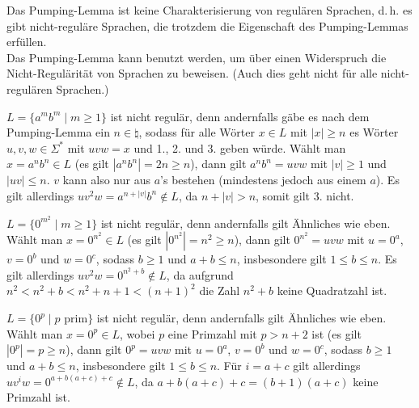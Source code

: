 \begin{Bem}
    Das Pumping-Lemma ist keine Charakterisierung von regulären Sprachen,
    d.\,h. es gibt nicht-reguläre Sprachen, die trotzdem die Eigenschaft des
    Pumping-Lemmas erfüllen.\\
    Das Pumping-Lemma kann benutzt werden, um über einen Widerspruch die
    Nicht-Regulärität von Sprachen zu beweisen.
    (Auch dies geht nicht für alle nicht-regulären Sprachen.)
\end{Bem}

\linie

\begin{Bsp}
    $L = \{a^m b^m \;|\; m \ge 1\}$ ist nicht regulär, denn andernfalls
    gäbe es nach dem Pumping-Lemma ein $n \in \natural$, sodass für alle
    Wörter $x \in L$ mit $|x| \ge n$ es Wörter $u, v, w \in \Sigma^\ast$
    mit $uvw = x$ und 1., 2. und 3. geben würde.
    Wählt man $x = a^n b^n \in L$ (es gilt $|a^n b^n| = 2n \ge n$),
    dann gilt $a^n b^n = uvw$ mit $|v| \ge 1$ und $|uv| \le n$.
    $v$ kann also nur aus $a$'s bestehen (mindestens jedoch aus einem $a$).
    Es gilt allerdings $uv^2 w = a^{n + |v|} b^n \notin L$, da
    $n + |v| > n$, somit gilt 3. nicht.
\end{Bsp}

\begin{Bsp}
    $L = \{0^{m^2} \;|\; m \ge 1\}$ ist nicht regulär, denn andernfalls
    gilt Ähnliches wie eben.
    Wählt man $x = 0^{n^2} \in L$ (es gilt $|0^{n^2}| = n^2 \ge n$),
    dann gilt $0^{n^2} = uvw$ mit $u = 0^a$, $v = 0^b$ und $w = 0^c$,
    sodass $b \ge 1$ und $a + b \le n$,
    insbesondere gilt $1 \le b \le n$.
    Es gilt allerdings $uv^2 w = 0^{n^2 + b} \notin L$, da aufgrund
    $n^2 < n^2 + b < n^2 + n + 1 < (n + 1)^2$ die Zahl $n^2 + b$ keine
    Quadratzahl ist.
\end{Bsp}

\begin{Bsp}
    $L = \{0^p \;|\; p \text{ prim}\}$ ist nicht regulär, denn andernfalls
    gilt Ähnliches wie eben.
    Wählt man $x = 0^p \in L$, wobei $p$ eine Primzahl mit $p > n + 2$ ist
    (es gilt $|0^p| = p \ge n$),
    dann gilt $0^p = uvw$ mit $u = 0^a$, $v = 0^b$ und $w = 0^c$,
    sodass $b \ge 1$ und $a + b \le n$,
    insbesondere gilt $1 \le b \le n$.
    Für $i = a + c$ gilt allerdings $uv^i w = 0^{a + b(a + c) + c} \notin L$,
    da $a + b(a + c) + c = (b + 1)(a + c)$ keine Primzahl ist.
\end{Bsp}

\pagebreak

